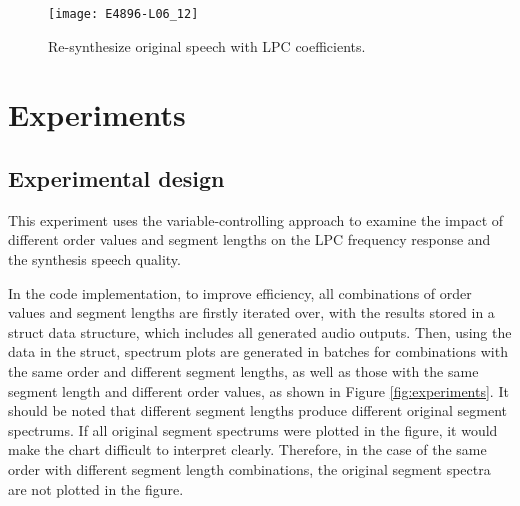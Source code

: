 \documentclass{article}
\begin{document}
\begin{figure}[ht]
\begin{center}
\texttt{[image: E4896-L06\_12]}
\end{center}
\caption{\label{fig:synthesis} Re-synthesize original speech with LPC coefficients\citep{E4896-L06}.}
\end{figure}


\section{Experiments}

\subsection{Experimental design}

This experiment uses the variable-controlling approach to examine the impact of different order values and segment lengths on the LPC frequency response and the synthesis speech quality.

In the code implementation, to improve efficiency, all combinations of order values and segment lengths are firstly iterated over, with the results stored in a struct data structure, which includes all generated audio outputs. Then, using the data in the struct, spectrum plots are generated in batches for combinations with the same order and different segment lengths, as well as those with the same segment length and different order values, as shown in Figure \ref{fig:experiments}. It should be noted that different segment lengths produce different original segment spectrums. If all original segment spectrums were plotted in the figure, it would make the chart difficult to interpret clearly. Therefore, in the case of the same order with different segment length combinations, the original segment spectra are not plotted in the figure.
\end{document}
